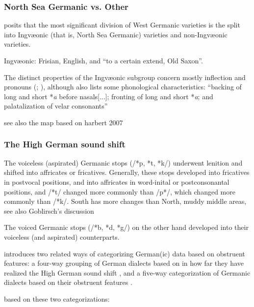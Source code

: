 \documentclass[a4paper]{article}
\begin{document}
\subsubsection{North Sea Germanic vs. Other}
\citet{stiles2013pan-west} posits that the most significant division of West Germanic varieties is the split into Ingv\ae{}onic (that is, North Sea Germanic) varieties and non-Ingv\ae{}onic varieties.

Ingv\ae{}onic: Frisian, English, and ``to a certain extend, Old Saxon''.

The distinct properties of the Ingv\ae{}onic subgroup
concern mostly inflection and pronouns (\citet{stiles2013pan-west}; \citet[pp. 7-8]{harbert2007germanic}),
although \citet{stiles2013pan-west} also lists some phonological characteristics:
``backing of long and short *\textit{a} before nasals[...]; fronting of long and short *\textit{a}; and palatalization of velar consonants''

see also the map based on harbert 2007



\subsubsection{The High German sound shift}

\citep[p. 47]{harbert2007germanic}
The voiceless (aspirated) Germanic stops (/*p, *t, *k/)
underwent lenition and shifted into affricates or fricatives.
Generally, these stops developed into fricatives in postvocal positions,
and into affricates in word-inital or postconsonantal positions,
and /*t/ changed more commonly than /p*/, which changed more commonly than /*k/.
South has more changes than North, muddy middle areas, see also Goblirsch's discussion

\citep[p. 48]{harbert2007germanic}
The voiced Germanic stops (/*b, *d, *g/) on the other hand
developed into their voiceless (and aspirated) counterparts.

\citeauthor{goblirsch2005lautverschiebungen} introduces
two related ways of categorizing German(ic) data based on obstruent features:
a four-way grouping of German dialects
based on in how far they have realized the High German sound shift \citeyearpar[pp. 182-199]{goblirsch2005lautverschiebungen},
and a five-way categorization of Germanic dialects
based on their obstruent features \citeyearpar[pp. TODO]{goblirsch2005lautverschiebungen}.

based on these two categorizations:
\end{document}
